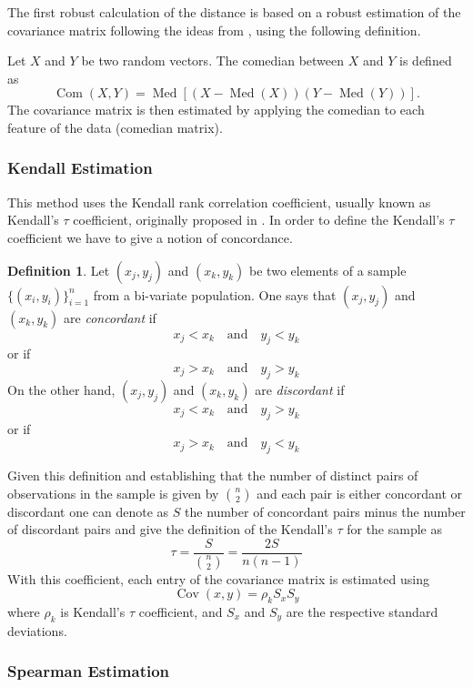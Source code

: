 \documentclass[11pt]{article}
\theoremstyle{definition}
\newtheorem{definition}{Definition}[section]
\theoremstyle{remark}
\theoremstyle{remark}
\theoremstyle{remark}
\begin{document}
The first robust calculation of the distance is based on a robust estimation of
the covariance matrix following the ideas from \parencite{falk1997mad}, using
the following definition.

Let $X$ and $Y$ be two random vectors. The comedian between $X$ and $Y$ is
defined as
%
\[
  \operatorname{Com}(X, Y)=\operatorname{Med}[(X-\operatorname{Med}(X))(Y-\operatorname{Med}(Y))].
\]
%
The covariance matrix is then estimated by applying the comedian to each feature
of the data (comedian matrix).

\subsubsection{Kendall Estimation}

This method uses the Kendall rank correlation coefficient, usually known as
Kendall's $\tau$ coefficient, originally proposed in \parencite{kendall1938new}.
In order to define the Kendall's $\tau$ coefficient we have to give a notion of
concordance.

\begin{definition}
  Let $(x_{j},y_{j})$ and $(x_{k},y_{k})$ be two elements of a sample
  $\{(x_{i},y_{i})\}_{i=1}^{n}$ from a bi-variate population. One says that
  $(x_{j},y_{j})$ and $(x_{k},y_{k})$ are \textit{concordant} if
  \[
    x_{j} < x_{k} \quad \text{and} \quad y_{j} < y_{k}
  \]
  or if
  \[
    x_{j} > x_{k} \quad \text{and} \quad y_{j} > y_{k}
  \]
  On the other hand, $(x_{j},y_{j})$ and $(x_{k},y_{k})$ are \textit{discordant}
  if
  \[
    x_{j} < x_{k} \quad \text{and} \quad y_{j} > y_{k}
  \]
  or if
  \[
    x_{j} > x_{k} \quad \text{and} \quad y_{j} < y_{k}
  \]
\end{definition}

Given this definition and establishing that the number of distinct pairs of
observations in the sample is given by $\binom{n}{2}$ and each pair is either
concordant or discordant one can denote as $S$ the number of concordant pairs
minus the number of discordant pairs and give the definition of the Kendall's
$\tau$ for the sample as
%
\[
  \tau = \dfrac{S}{\binom{n}{2}} = \dfrac{2S}{n(n-1)}
\]
%
With this coefficient, each entry of the covariance matrix is estimated using
%
\[
  \operatorname{Cov}(x, y)=\rho_{k} S_{x} S_{y}
\]
%
where $\rho_{k}$ is Kendall's $\tau$ coefficient, and $S_{x}$ and $S_{y}$ are
the respective standard deviations.

\subsubsection{Spearman Estimation}
\end{document}
